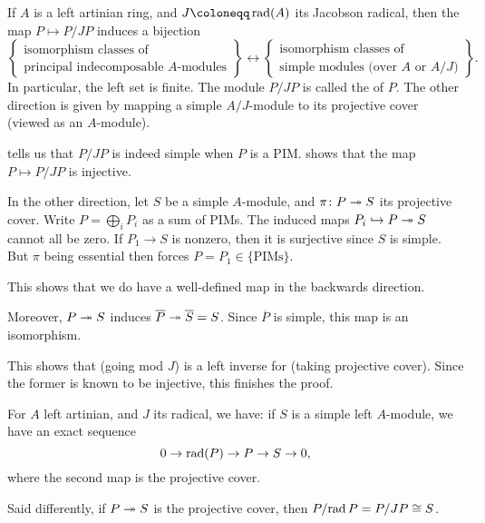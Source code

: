 \documentclass[12pt]{article}
\begin{document}
\begin{thm}
	If $A$ is a left artinian ring, and $J \coloneqq \rad(A)$ its Jacobson radical, then the map $P \mapsto P/JP$ induces a bijection
	\begin{equation*} 
		\left\{
			\begin{array}{c}
				\text{isomorphism classes of}\\
				\text{principal indecomposable $A$-modules}
			\end{array}
		\right\}
		\leftrightarrow
		\left\{
			\begin{array}{c}
				\text{isomorphism classes of}\\
				\text{simple modules (over $A$ or $A/J$)}
			\end{array}
		\right\}.
	\end{equation*}
	In particular, the left set is finite. 
	The module $P/JP$ is called the  of $P$. 
	The other direction is given by mapping a simple $A/J$-module to its projective cover (viewed as an $A$-module).
\end{thm}
\begin{sketch}
	 tells us that $P/JP$ is indeed simple when $P$ is a PIM. 
	 shows that the map $P \mapsto P/JP$ is injective.

	In the other direction, let $S$ be a simple $A$-module, and $\pi \colon P \twoheadrightarrow S$ its projective cover. 
	Write $P = \bigoplus_{i} P_{i}$ as a sum of PIMs. 
	The induced maps $P_{i} \hookrightarrow P \twoheadrightarrow S$ cannot all be zero. 
	If $P_{1} \to S$ is nonzero, then it is surjective since $S$ is simple.
	But $\pi$ being essential then forces $P = P_{1} \in \{\text{PIMs}\}$.

	This shows that we do have a well-defined map in the backwards direction.

	Moreover, $P \twoheadrightarrow S$ induces $\overline{P} \twoheadrightarrow \overline{S} = S$. 
	Since $\overline{P}$ is simple, this map is an isomorphism. 

	This shows that (going mod $J$) is a left inverse for (taking projective cover). 
	Since the former is known to be injective, this finishes the proof.
\end{sketch}

\begin{cor}
	For $A$ left artinian, and $J$ its radical, we have: if $S$ is a simple left $A$-module, we have an exact sequence
	\begin{equation*} 
		0 \to \operatorname{rad}(P) \to P \to S \to 0,
	\end{equation*}
	where the second map is the projective cover.

	Said differently, if $P \twoheadrightarrow S$ is the projective cover, then $P/{\operatorname{rad} P} = P/JP \cong S$.
\end{cor}
\end{document}
